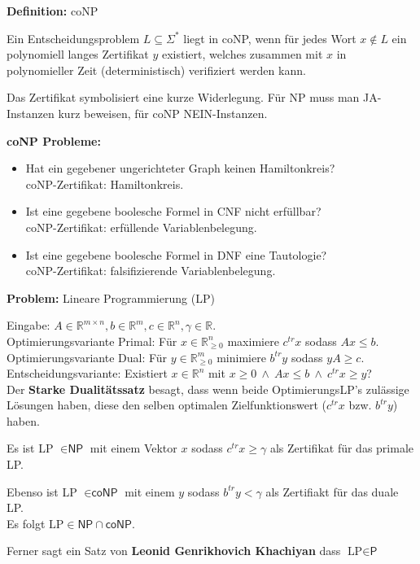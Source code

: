 \documentclass[a4paper,graphics,11pt]{article}
\begin{document}
\strut

\textbf{Definition:} \textsf{coNP}

Ein Entscheidungsproblem $L \subseteq \Sigma^*$ liegt in \textsf{coNP}, wenn für
jedes Wort $x \notin L$ ein polynomiell langes Zertifikat $y$ existiert, welches
zusammen mit $x$ in polynomieller Zeit (deterministisch) verifiziert werden kann.

Das Zertifikat symbolisiert eine kurze Widerlegung. Für \textsf{NP} muss man JA-Instanzen
kurz beweisen, für \textsf{coNP} NEIN-Instanzen.

\strut

\textbf{\textsf{coNP} Probleme:}
\begin{itemize}
    \item Hat ein gegebener ungerichteter Graph keinen Hamiltonkreis?\\[5pt]
        \textsf{coNP}-Zertifikat: Hamiltonkreis.
    \item Ist eine gegebene boolesche Formel in CNF nicht erfüllbar?\\[5pt]
        \textsf{coNP}-Zertifikat: erfüllende Variablenbelegung.
    \item Ist eine gegebene boolesche Formel in DNF eine Tautologie?\\[5pt]
        \textsf{coNP}-Zertifikat: falsifizierende Variablenbelegung.
\end{itemize}

\newpage

\textbf{Problem:} Lineare Programmierung (LP)

Eingabe: $A \in \mathbb{R}^{m \times n}, b \in \mathbb{R}^m, c \in \mathbb{R}^n, \gamma \in \mathbb{R}$.
\\[10pt]
Optimierungsvariante Primal: Für $x \in \mathbb{R}^n_{\geq 0}$ maximiere $c^{tr}x$ sodass $Ax \leq b$.
\\[10pt]
Optimierungsvariante Dual: Für $y \in \mathbb{R}^m_{\geq 0}$ minimiere $b^{tr}y$ sodass $yA \geq c$.
\\[10pt]
Entscheidungsvariante: Existiert $x \in \mathbb{R}^n$ mit $x \geq 0\ \land\ Ax \leq b\ \land\ c^{tr}x \geq y$?
\\[30pt]
Der \textbf{Starke Dualitätssatz} besagt, dass wenn beide OptimierungsLP's zulässige Lösungen haben,
diese den selben optimalen Zielfunktionswert ($c^{tr}x$ bzw. $b^{tr}y$) haben.

Es ist LP $\in \textsf{NP}$ mit einem Vektor $x$ sodass $c^{tr}x \geq \gamma$ als Zertifikat für das primale LP.

Ebenso ist LP $\in \textsf{coNP}$ mit einem $y$ sodass $b^{tr}y < \gamma$ als Zertifiakt für das duale LP.
\\[30pt]
Es folgt $\text{LP} \in \textsf{NP} \cap \textsf{coNP}$.

Ferner sagt ein Satz von \textbf{Leonid Genrikhovich Khachiyan} dass $\text{LP} \in \textsf{P}$
\end{document}
